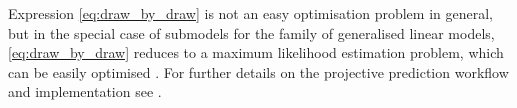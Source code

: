 \documentclass[american,]{article}
\theoremstyle{definition}
\begin{document}
Expression \eqref{eq:draw_by_draw} is not an easy optimisation problem
in general, but in the special case of submodels for the family of
generalised linear models, \eqref{eq:draw_by_draw} reduces to a
maximum likelihood estimation problem, which can be easily optimised
\citep{paper:original_proj}. For further details on the projective
prediction workflow and implementation see \cite{paper:projpred}.
\end{document}
